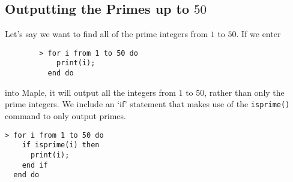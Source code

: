 \subsection{Outputting the Primes up to $50$}


Let's say we want to find all of the prime integers from $1$ to $50$. If we enter 
\begin{maplegroup}
	\begin{mapleinput}
		\begin{verbatim}
		> for i from 1 to 50 do
		    print(i);
		  end do
		\end{verbatim}
	\end{mapleinput}
\end{maplegroup}
\noindent
into Maple, it will output all the integers from $1$ to $50$, rather than only the prime integers. We include an `if' statement that makes use of the \texttt{isprime()} command to only output primes. 

\begin{maplegroup}
\begin{mapleinput}
\begin{verbatim}
> for i from 1 to 50 do
    if isprime(i) then
      print(i);
    end if
  end do
\end{verbatim}
\end{mapleinput}
\mapleresult
{}
\begin{maplelatex}
\end{maplelatex}
\mapleresult
\begin{maplelatex}
\end{maplelatex}
\mapleresult
\begin{maplelatex}
\end{maplelatex}
\mapleresult
\begin{maplelatex}
\end{maplelatex}
\mapleresult
\begin{maplelatex}
\end{maplelatex}
\mapleresult
\begin{maplelatex}
\end{maplelatex}
\mapleresult
\begin{maplelatex}
\end{maplelatex}
\mapleresult
\begin{maplelatex}
\end{maplelatex}
\begin{maplelatex}
\end{maplelatex}
\end{maplegroup}

